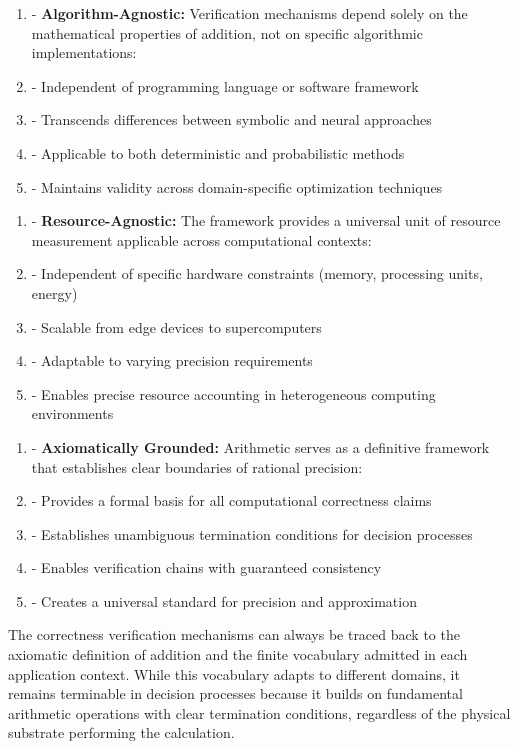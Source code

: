 \begin{enumerate}
  \item - \textbf{Algorithm-Agnostic:} Verification mechanisms depend solely on the mathematical properties of addition, not on specific algorithmic implementations:
  \item - Independent of programming language or software framework
  \item - Transcends differences between symbolic and neural approaches
  \item - Applicable to both deterministic and probabilistic methods
  \item - Maintains validity across domain-specific optimization techniques
\end{enumerate}

\begin{enumerate}
  \item - \textbf{Resource-Agnostic:} The framework provides a universal unit of resource measurement applicable across computational contexts:
  \item - Independent of specific hardware constraints (memory, processing units, energy)
  \item - Scalable from edge devices to supercomputers
  \item - Adaptable to varying precision requirements
  \item - Enables precise resource accounting in heterogeneous computing environments
\end{enumerate}

\begin{enumerate}
  \item - \textbf{Axiomatically Grounded:} Arithmetic serves as a definitive framework that establishes clear boundaries of rational precision:
  \item - Provides a formal basis for all computational correctness claims
  \item - Establishes unambiguous termination conditions for decision processes
  \item - Enables verification chains with guaranteed consistency
  \item - Creates a universal standard for precision and approximation
\end{enumerate}

The correctness verification mechanisms can always be traced back to the axiomatic definition of addition and the finite vocabulary admitted in each application context. While this vocabulary adapts to different domains, it remains terminable in decision processes because it builds on fundamental arithmetic operations with clear termination conditions, regardless of the physical substrate performing the calculation.

